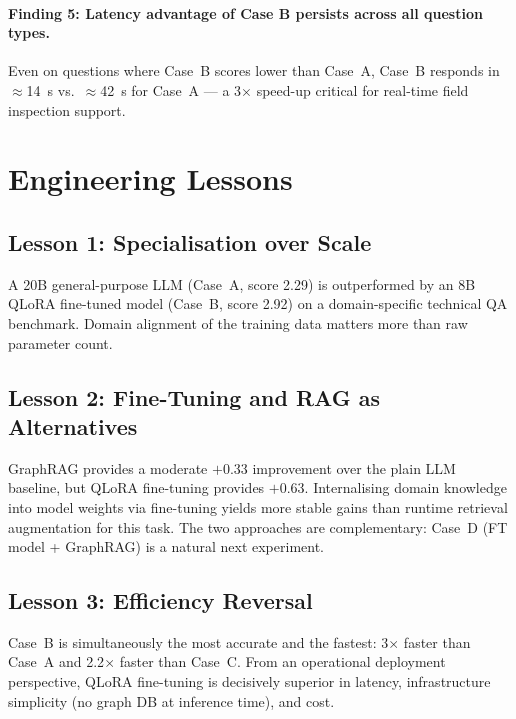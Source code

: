 \documentclass[twocolumn]{article}
\begin{document}
\paragraph{Finding 5: Latency advantage of Case B persists across all question types.}
Even on questions where Case~B scores lower than Case~A,
Case~B responds in $\approx$14~s vs.\ $\approx$42~s for Case~A ---
a 3$\times$ speed-up critical for real-time field inspection support.

\section{Engineering Lessons}
\label{sec:lessons}

\subsection{Lesson 1: Specialisation over Scale}

A 20B general-purpose LLM (Case~A, score 2.29) is outperformed by an 8B QLoRA
fine-tuned model (Case~B, score 2.92) on a domain-specific technical QA benchmark.
Domain alignment of the training data matters more than raw parameter count.

\subsection{Lesson 2: Fine-Tuning and RAG as Alternatives}

GraphRAG provides a moderate $+0.33$ improvement over the plain LLM baseline,
but QLoRA fine-tuning provides $+0.63$.
Internalising domain knowledge into model weights via fine-tuning yields more stable gains
than runtime retrieval augmentation for this task.
The two approaches are complementary:
Case~D (FT model + GraphRAG) is a natural next experiment.

\subsection{Lesson 3: Efficiency Reversal}

Case~B is simultaneously the most accurate and the fastest:
3$\times$ faster than Case~A and 2.2$\times$ faster than Case~C.
From an operational deployment perspective, QLoRA fine-tuning is decisively superior
in latency, infrastructure simplicity (no graph DB at inference time), and cost.
\end{document}
